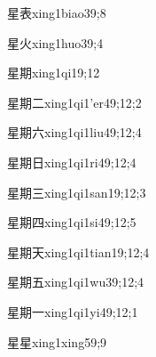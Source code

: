 \begin{verbete}{星表}{xing1biao3}{9;8}
\end{verbete}

\begin{verbete}{星火}{xing1huo3}{9;4}
\end{verbete}

\begin{verbete}{星期}{xing1qi1}{9;12}
\end{verbete}

\begin{verbete}{星期二}{xing1qi1'er4}{9;12;2}
\end{verbete}

\begin{verbete}{星期六}{xing1qi1liu4}{9;12;4}
\end{verbete}

\begin{verbete}{星期日}{xing1qi1ri4}{9;12;4}
\end{verbete}

\begin{verbete}{星期三}{xing1qi1san1}{9;12;3}
\end{verbete}

\begin{verbete}{星期四}{xing1qi1si4}{9;12;5}
\end{verbete}

\begin{verbete}{星期天}{xing1qi1tian1}{9;12;4}
\end{verbete}

\begin{verbete}{星期五}{xing1qi1wu3}{9;12;4}
\end{verbete}

\begin{verbete}{星期一}{xing1qi1yi4}{9;12;1}
\end{verbete}

\begin{verbete}{星星}{xing1xing5}{9;9}
\end{verbete}


